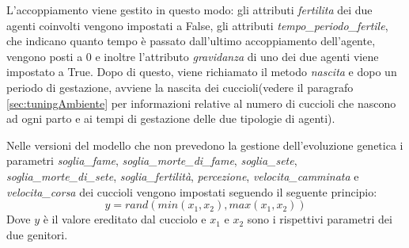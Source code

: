\documentclass[11pt]{article}
\begin{document}
L'accoppiamento viene gestito in questo modo: gli attributi \emph{fertilita} dei due agenti coinvolti vengono impostati a False, gli attributi \emph{tempo\_periodo\_fertile}, che indicano quanto tempo è passato dall'ultimo accoppiamento dell'agente, vengono posti a 0 e inoltre l'attributo \emph{gravidanza} di uno dei due agenti viene impostato a True.
Dopo di questo, viene richiamato il metodo \emph{nascita} e dopo un periodo di gestazione, avviene la nascita  dei cuccioli(vedere il paragrafo \ref{sec:tuningAmbiente} per informazioni relative al numero di cuccioli che nascono ad ogni parto e ai tempi di gestazione delle due tipologie di agenti).

\vspace{20pt}

\noindent Nelle versioni del modello che non prevedono la gestione dell'evoluzione genetica i parametri \emph{soglia\_fame}, \emph{soglia\_morte\_di\_fame}, \emph{soglia\_sete}, \emph{soglia\_morte\_di\_sete}, \emph{soglia\_fertilità}, \emph{percezione}, \emph{velocita\_camminata} e \emph{velocita\_corsa} dei cuccioli vengono impostati seguendo il seguente principio: 
\[
    y = rand(min(x_1, x_2), max(x_1, x_2))
\]
Dove $y$ è il valore ereditato dal cucciolo e $x_1$ e $x_2$ sono i rispettivi parametri dei due genitori.  
\end{document}

